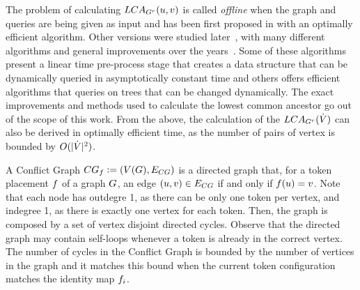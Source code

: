 \documentclass[msc,english,table,xcdraw]{ppgccufmg}
\begin{document}
The problem of calculating $LCA_{G^{r}}(u, v)$ is called \textit{offline} 
when the graph and queries are being given as input and has been first proposed 
in \cite{Aho:1973} with an optimally efficient algorithm. 
Other versions were studied later~\cite{Harel:1984}, with many different 
algorithms and general improvements over the years~\cite{Alstrup:2004}.
Some of these algorithms present a linear time pre-process stage that creates a 
data structure that can be dynamically queried in asymptotically constant time 
and others offers efficient algorithms that queries on trees that can be changed
dynamically.
The exact improvements and methods used to calculate the lowest common ancestor 
go out of the scope of this work.
From the above, the calculation of the $LCA_{G^{r}}(\dot{V})$ can also be
derived in optimally efficient time, as the number of pairs of vertex is bounded 
by $O(|\dot{V}|^2)$.


A Conflict Graph $CG_{f} \vcentcolon= (V(G), 
E_{CG})$ is a directed graph that, for a token placement 
$f$ of a graph $G$, an edge $(u, v) \in 
E_{CG}$ if and only if $f(u) = v$.
Note that each node has outdegre 1, as there can be only one token per vertex, and indegree 1, as there is exactly one vertex for each token. Then, the graph is composed by a set of vertex disjoint directed cycles.
Observe that the directed graph may contain self-loops whenever a token is already in the
correct vertex. The number of cycles in the Conflict Graph is bounded by the number of vertices in the graph and it matches this bound when the current token configuration matches the identity map $f_{i}$.
\end{document}
